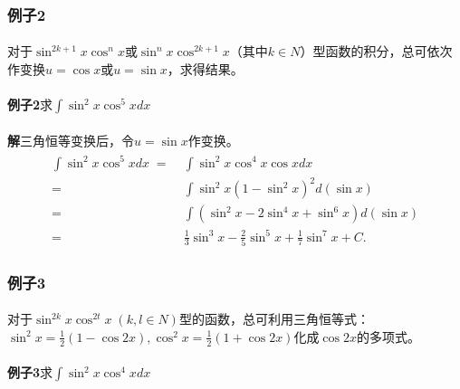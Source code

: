 \subsubsection{例子2}
\paragraph{}
对于$\sin^{2k+1}x\cos^nx$或$\sin^nx\cos^{2k+1}x$（其中$k\in N$）型函数的积分，总可依次作变换$u=\cos{x}$或$u=\sin{x}$，求得结果。

\paragraph{}
\textbf{例子2\;}求$\displaystyle\int{\sin^2x\cos^5xdx}$

\paragraph{}
\textbf{解\;}三角恒等变换后，令$u=\sin{x}$作变换。
\begin{align*}
\begin{split}
  \int\sin^2x\cos^5xdx \;=&\; \int\sin^2x\cos^4x\cos{x}dx \\
    =&\; \int\sin^2x(1-\sin^2x)^2d(\sin{x})  \\
    =&\; \int(\sin^2x-2\sin^4x + \sin^6x)d(\sin{x}) \\
    =&\; \frac{1}{3}\sin^3x-\frac{2}{5}\sin^5x+\frac{1}{7}\sin^7x + C.
\end{split}
\end{align*}

\subsubsection{例子3}
\label{第一类换元法例子3}
\paragraph{}
对于$\sin^{2k}x\cos^{2t}x \; (k,l \in N)$型的函数，总可利用三角恒等式：$\displaystyle\sin^2x=\frac{1}{2}(1-\cos{2x}), \cos^2x = \frac{1}{2}(1+\cos{2x})$化成$\cos{2x}$的多项式。

\paragraph{}
\textbf{例子3\;}求$\displaystyle\int\sin^2x\cos^4xdx$

